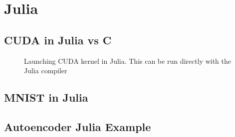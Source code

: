 \chapter{Julia}
\label{app:julia}

\section{CUDA in Julia vs C}
\label{app:jlscicomp}

\begin{figure}[!h]
    \centering
    
    \caption{Launching CUDA kernel in Julia. This can be run directly with the Julia compiler}
    \label{fig:jlcuda}
\end{figure}
 


\section{MNIST in Julia}



\section{Autoencoder Julia Example}

